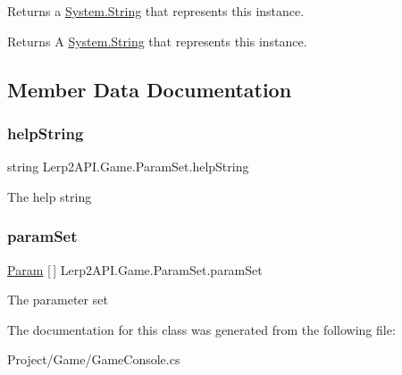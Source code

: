 Returns a \hyperlink{namespace_lerp2_a_p_i_1_1_game_a2f182da062f210cc43f341f6992ee293a27118326006d3829667a400ad23d5d98}{System.\+String} that represents this instance. 

\begin{DoxyReturn}{Returns}
A \hyperlink{namespace_lerp2_a_p_i_1_1_game_a2f182da062f210cc43f341f6992ee293a27118326006d3829667a400ad23d5d98}{System.\+String} that represents this instance.
\end{DoxyReturn}


\subsection{Member Data Documentation}
\mbox{\label{class_lerp2_a_p_i_1_1_game_1_1_param_set_a29904c3b8e98ce7bfb16a982d0536f80}} 
\subsubsection{\texorpdfstring{help\+String}{helpString}}
{\footnotesize\ttfamily string Lerp2\+A\+P\+I.\+Game.\+Param\+Set.\+help\+String}



The help string 

\mbox{\label{class_lerp2_a_p_i_1_1_game_1_1_param_set_a7805f58beae9b1f9aafbcb233341c212}} 
\subsubsection{\texorpdfstring{param\+Set}{paramSet}}
{\footnotesize\ttfamily \hyperlink{class_lerp2_a_p_i_1_1_game_1_1_param}{Param} \mbox{[}$\,$\mbox{]} Lerp2\+A\+P\+I.\+Game.\+Param\+Set.\+param\+Set}



The parameter set 



The documentation for this class was generated from the following file\+:\begin{DoxyCompactItemize}
\item 
Project/\+Game/Game\+Console.\+cs\end{DoxyCompactItemize}
